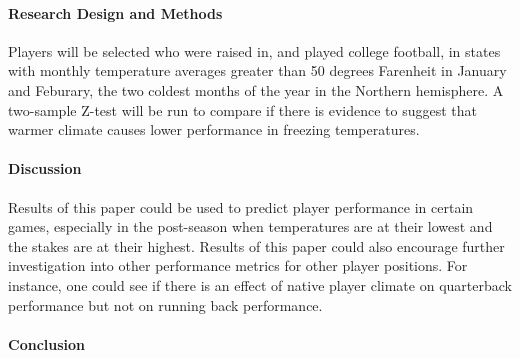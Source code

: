 \documentclass[12pt]{article}
\begin{document}
\lipsum[3]

\paragraph{Research Design and Methods}
Players will be selected who were raised in, and played college football, in states with monthly 
temperature averages greater than 50 degrees Farenheit in January and Feburary, the two coldest 
months of the year in the Northern hemisphere. A two-sample Z-test will be run to compare if 
there is evidence to suggest that warmer climate causes lower performance in freezing temperatures. 

\lipsum[4]

\paragraph{Discussion}
Results of this paper could be used to predict player performance in certain games, especially 
in the post-season when temperatures are at their lowest and the stakes are at their highest. 
Results of this paper could also encourage further investigation into other performance metrics 
for other player positions. For instance, one could see if there is an effect of native player 
climate on quarterback performance but not on running back performance.

\lipsum[5] 

\paragraph{Conclusion}
\lipsum[1]




\end{document}
